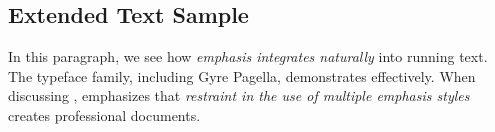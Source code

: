 \documentclass[11pt,a4paper]{article}
\begin{document}
\subsection{Extended Text Sample}

\lipsum[1]

In this paragraph, we see how \emph{emphasis integrates naturally} into running text. The  typeface family, including  Gyre Pagella, demonstrates  effectively. When discussing ,  emphasizes that \emph{restraint in the use of \emph{multiple} emphasis styles} creates professional documents.

\lipsum[2]
\end{document}
